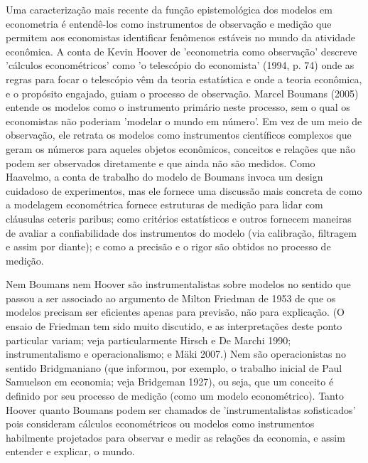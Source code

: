 \documentclass[a4paper,12pt]{article}[abntex2]
\begin{document}
Uma caracterização mais recente da função epistemológica dos modelos em econometria é entendê-los como instrumentos de observação e medição que permitem aos economistas identificar fenômenos estáveis no mundo da atividade econômica. A conta de Kevin Hoover de 'econometria como observação' descreve 'cálculos econométricos' como 'o telescópio do economista' (1994, p. 74) onde as regras para focar o telescópio vêm da teoria estatística e onde a teoria econômica, e o propósito engajado, guiam o processo de observação. Marcel Boumans (2005) entende os modelos como o instrumento primário neste processo, sem o qual os economistas não poderiam 'modelar o mundo em número'. Em vez de um meio de observação, ele retrata os modelos como instrumentos científicos complexos que geram os números para aqueles objetos econômicos, conceitos e relações que não podem ser observados diretamente e que ainda não são medidos. Como Haavelmo, a conta de trabalho do modelo de Boumans invoca um design cuidadoso de experimentos, mas ele fornece uma discussão mais concreta de como a modelagem econométrica fornece estruturas de medição para lidar com cláusulas ceteris paribus; como critérios estatísticos e outros fornecem maneiras de avaliar a confiabilidade dos instrumentos do modelo (via calibração, filtragem e assim por diante); e como a precisão e o rigor são obtidos no processo de medição.

Nem Boumans nem Hoover são instrumentalistas sobre modelos no sentido que passou a ser associado ao argumento de Milton Friedman de 1953 de que os modelos precisam ser eficientes apenas para previsão, não para explicação. (O ensaio de Friedman tem sido muito discutido, e as interpretações deste ponto particular variam; veja particularmente Hirsch e De Marchi 1990; instrumentalismo e operacionalismo; e Mäki 2007.) Nem são operacionistas no sentido Bridgmaniano (que informou, por exemplo, o trabalho inicial de Paul Samuelson em economia; veja Bridgeman 1927), ou seja, que um conceito é definido por seu processo de medição (como um modelo econométrico). Tanto Hoover quanto Boumans podem ser chamados de 'instrumentalistas sofisticados' pois consideram cálculos econométricos ou modelos como instrumentos habilmente projetados para observar e medir as relações da economia, e assim entender e explicar, o mundo.
\end{document}
